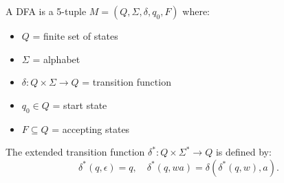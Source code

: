 \begin{definition}
A DFA is a 5-tuple $M = (Q, \Sigma, \delta, q_0, F)$ where:
\begin{itemize}
    \item $Q$ = finite set of states
    \item $\Sigma$ = alphabet
    \item $\delta : Q \times \Sigma \to Q$ = transition function
    \item $q_0 \in Q$ = start state
    \item $F \subseteq Q$ = accepting states
\end{itemize}
\end{definition}

\begin{definition}
The extended transition function $\delta^* : Q \times \Sigma^* \to Q$ is defined by:
\[
\delta^*(q,\epsilon) = q, \quad
\delta^*(q, w a) = \delta(\delta^*(q, w), a).
\]
\end{definition}
